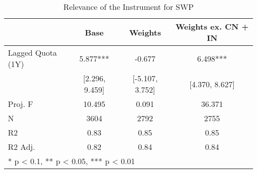 \begin{table}
\tablefontapp
\caption{Relevance of the Instrument for SWP\label{tab:iv_rel}}
\centering
\begin{tabular}[t]{lccc}
\toprule
  & Base & Weights & Weights ex. CN + IN\\
\midrule
Lagged Quota (1Y) & 5.877*** & -0.677 & 6.498***\\
 & [2.296, 9.459] & [-5.107, 3.752] & [4.370, 8.627]\\
\midrule
Proj. F & 10.495 & 0.091 & 36.371\\
N & 3604 & 2792 & 2755\\
R2 & 0.83 & 0.85 & 0.85\\
R2 Adj. & 0.82 & 0.84 & 0.84\\
\bottomrule
\multicolumn{4}{l}{\textsuperscript{} * p < 0.1, ** p < 0.05, *** p < 0.01}\\
\end{tabular}
\end{table}
